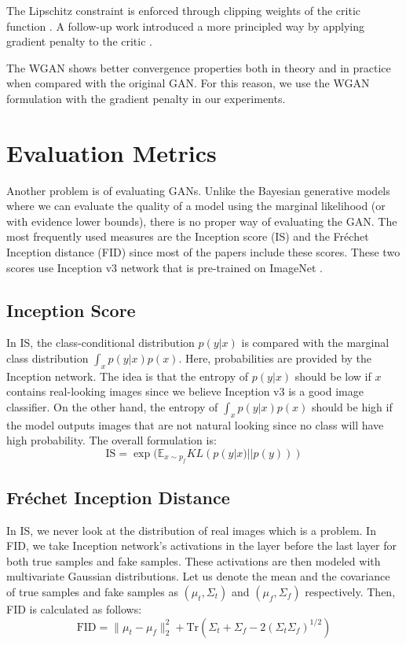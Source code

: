 \documentclass[a4paper,onesided,12pt]{report}
\begin{document}
The Lipschitz constraint is enforced through clipping weights of the critic function \cite{arjovsky2017wasserstein}. A follow-up work introduced a more principled way by applying gradient penalty to the critic \cite{gulrajani2017improved}.

The WGAN shows better convergence properties both in theory and in practice when compared with the original GAN. For this reason, we use the WGAN formulation with the gradient penalty \cite{gulrajani2017improved} in our experiments.

\section{Evaluation Metrics}
\label{sec:evaluation}

Another problem is of evaluating GANs. Unlike the Bayesian generative models where we can evaluate the quality of a model using the marginal likelihood (or with evidence lower bounds), there is no proper way of evaluating the GAN. The most frequently used measures are the Inception score (IS) \cite{salimans2016improved} and the Fr\'echet Inception distance (FID) \cite{heusel2017gans} since most of the papers include these scores. These two scores use Inception v3 network \cite{szegedy2016rethinking} that is pre-trained on ImageNet \cite{deng2009imagenet}.

\subsection{Inception Score}
\label{subsec:is}
In IS, the class-conditional distribution $p(y|x)$ is compared with the marginal class distribution $\int_x p(y|x) p(x)$. Here, probabilities are provided by the Inception network. The idea is that the entropy of $p(y|x)$ should be low if $x$ contains real-looking images since we believe Inception v3 is a good image classifier. On the other hand, the entropy of $\int_x p(y | x) p(x)$ should be high if the model outputs images that are not natural looking since no class will have high probability. The overall formulation is:
\begin{equation}
\label{eq:is}
\text{IS}=\exp (\mathbb{E}_{x \sim p_f} KL (p(y|x) || p(y))) 
\end{equation}

\subsection{Fr\'echet Inception Distance}
\label{subsec:fid}
In IS, we never look at the distribution of real images which is a problem. In FID, we take Inception network's activations in the layer before the last layer for both true samples and fake samples. These activations are then modeled with multivariate Gaussian distributions. Let us denote the mean and the covariance of true samples and fake samples as $(\mu_t, \Sigma_t)$ and $(\mu_f, \Sigma_f)$ respectively. Then, FID is calculated as follows:
\begin{equation}
\label{eq:fid}
\text{FID} = \| \mu_t - \mu_f \|_2^2 + \text{Tr}(\Sigma_t + \Sigma_f - 2(\Sigma_t \Sigma_f)^{1/2})
\end{equation}
\end{document}
